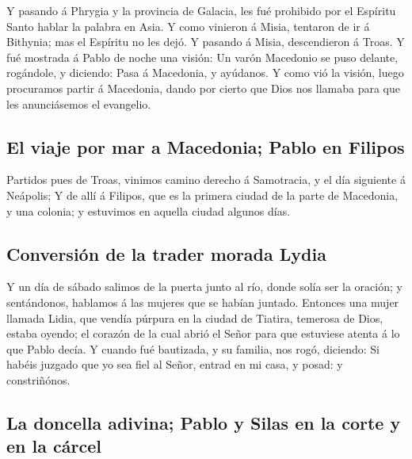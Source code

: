  Y pasando á Phrygia y la provincia de Galacia, les fué
prohibido por el Espíritu Santo hablar la palabra en Asia.
 Y como vinieron á Misia, tentaron de ir á Bithynia; mas
el Espíritu no les dejó.  Y pasando á Misia, descendieron
á Troas.  Y fué mostrada á Pablo de noche una visión: Un
varón Macedonio se puso delante, rogándole, y diciendo: Pasa á
Macedonia, y ayúdanos.  Y como vió la visión, luego
procuramos partir á Macedonia, dando por cierto que Dios nos llamaba
para que les anunciásemos el evangelio.

\hypertarget{el-viaje-por-mar-a-macedonia-pablo-en-filipos}{%
\subsection{El viaje por mar a Macedonia; Pablo en
Filipos}\label{el-viaje-por-mar-a-macedonia-pablo-en-filipos}}

 Partidos pues de Troas, vinimos camino derecho á
Samotracia, y el día siguiente á Neápolis;  Y de allí á
Filipos, que es la primera ciudad de la parte de Macedonia, y una
colonia; y estuvimos en aquella ciudad algunos días.

\hypertarget{conversiuxf3n-de-la-trader-morada-lydia}{%
\subsection{Conversión de la trader morada
Lydia}\label{conversiuxf3n-de-la-trader-morada-lydia}}

 Y un día de sábado salimos de la puerta junto al río,
donde solía ser la oración; y sentándonos, hablamos á las mujeres que se
habían juntado.  Entonces una mujer llamada Lidia, que
vendía púrpura en la ciudad de Tiatira, temerosa de Dios, estaba oyendo;
el corazón de la cual abrió el Señor para que estuviese atenta á lo que
Pablo decía.  Y cuando fué bautizada, y su familia, nos
rogó, diciendo: Si habéis juzgado que yo sea fiel al Señor, entrad en mi
casa, y posad: y constriñónos.

\hypertarget{la-doncella-adivina-pablo-y-silas-en-la-corte-y-en-la-cuxe1rcel}{%
\subsection{La doncella adivina; Pablo y Silas en la corte y en la
cárcel}\label{la-doncella-adivina-pablo-y-silas-en-la-corte-y-en-la-cuxe1rcel}}

